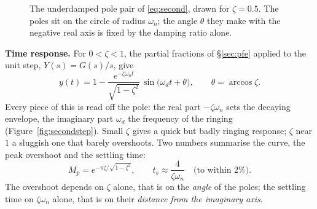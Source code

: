 \documentclass[11pt]{article}
\begin{document}
\begin{figure}[htb]
\centering
{}
\caption{The underdamped pole pair of \eqref{eq:second}, drawn for $\zeta=0.5$.
The poles sit on the circle of radius $\omega_n$; the angle $\theta$ they make with
the negative real axis is fixed by the damping ratio alone.}
\label{fig:secondpoles}
\end{figure}

\smallskip\noindent\textbf{Time response.} For $0<\zeta<1$, the partial fractions
of \S\ref{sec:pfe} applied to the unit step, $Y(s)=G(s)/s$, give
\begin{equation}\label{eq:secondstep}
   y(t) = 1 - \frac{e^{-\zeta\omega_n t}}{\sqrt{1-\zeta^{2}}}\,
          \sin\bigl(\omega_d t+\theta\bigr),
   \qquad \theta=\arccos\zeta .
\end{equation}
Every piece of this is read off the pole: the real part $-\zeta\omega_n$ sets the
decaying envelope, the imaginary part $\omega_d$ the frequency of the ringing
(Figure~\ref{fig:secondstep}). Small $\zeta$ gives a quick but badly ringing
response; $\zeta$ near $1$ a sluggish one that barely overshoots. Two numbers
summarise the curve, the peak overshoot and the settling time:
\begin{equation}\label{eq:overshoot}
   M_p = e^{-\pi\zeta/\sqrt{1-\zeta^{2}}},
   \qquad
   t_s \approx \frac{4}{\zeta\omega_n}\quad\text{(to within $2\%$)} .
\end{equation}
The overshoot depends on $\zeta$ alone, that is on the \emph{angle} of the poles;
the settling time on $\zeta\omega_n$ alone, that is on their \emph{distance from
the imaginary axis}.
\end{document}
